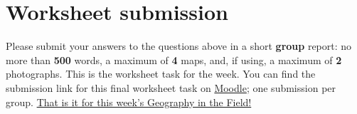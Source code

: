 \documentclass[
]{book}
\begin{document}
\hypertarget{worksheet-submission}{%
\section*{Worksheet submission}\label{worksheet-submission}}

Please submit your answers to the questions above in a short \textbf{group} report: no more than \textbf{500} words, a maximum of \textbf{4} maps, and, if using, a maximum of \textbf{2} photographs. This is the worksheet task for the week. You can find the submission link for this final worksheet task on \href{https://moodle.ucl.ac.uk/course/view.php?id=23839}{Moodle}; one submission per group. \href{https://www.youtube.com/watch?v=h_D3VFfhvs4}{That is it for this week's Geography in the Field!}
\end{document}
